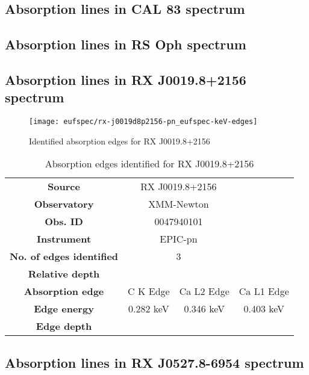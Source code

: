 		\subsection*{Absorption lines in CAL 83 spectrum}
		
		\subsection*{Absorption lines in RS Oph spectrum}
		
		\newpage
		\subsection*{Absorption lines in RX J0019.8+2156 spectrum}
			\begin{figure}[h!]
				\centering
				\texttt{[image: eufspec/rx-j0019d8p2156-pn\_eufspec-keV-edges]}
				\caption{Identified absorption edges for RX J0019.8+2156}
				\label{result:absedge-rx-j0019}
			\end{figure}
			
			\renewcommand{\arraystretch}{1.5}
			\begin{table}[!htb]
				\centering
				\caption{Absorption edges identified for RX J0019.8+2156}
				\label{tab:absedge-rx-j0019}
				\begin{tabular}{cccc}
					\cline{1-3}
					\textbf{Source} & \multicolumn{2}{c}{RX J0019.8+2156} & {} \\
					\textbf{Observatory} & \multicolumn{2}{c}{XMM-Newton}& {} \\
					\textbf{Obs. ID} & \multicolumn{2}{c}{0047940101}& {} \\
					\textbf{Instrument} & \multicolumn{2}{c}{EPIC-pn}& {} \\
					\textbf{No. of edges identified} & \multicolumn{2}{c}{3}& {} \\
					\textbf{Relative depth} & \multicolumn{2}{c}{}& {} \\ \hline
					\textbf{Absorption edge} & {C K Edge} & {Ca L2 Edge} & {Ca L1 Edge} \\
					\textbf{Edge energy} & {0.282 keV} & {0.346 keV} & {0.403 keV} \\
					\textbf{Edge depth} & {} & {} & {} \\ \hline
				\end{tabular}
			\end{table}
		
		\subsection*{Absorption lines in RX J0527.8-6954 spectrum}
		
